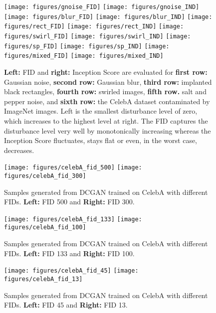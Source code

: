 \documentclass{article}
\begin{document}
\begin{figure}[H]
\texttt{[image: figures/gnoise\_FID]}
\texttt{[image: figures/gnoise\_IND]}
\texttt{[image: figures/blur\_FID]}
\texttt{[image: figures/blur\_IND]}
\texttt{[image: figures/rect\_FID]}
\texttt{[image: figures/rect\_IND]}
\texttt{[image: figures/swirl\_FID]}
\texttt{[image: figures/swirl\_IND]}
\texttt{[image: figures/sp\_FID]}
\texttt{[image: figures/sp\_IND]}
\texttt{[image: figures/mixed\_FID]}
\texttt{[image: figures/mixed\_IND]}
\caption[FID and Inception Score Comparison]{{\bf Left:} FID and {\bf right:}
Inception Score are evaluated for {\bf first row:} Gaussian noise, {\bf second row:} Gaussian blur, {\bf third row:}
implanted black rectangles, {\bf fourth row:} swirled images, {\bf fifth row.}
salt and pepper noise, and {\bf sixth row:} the CelebA dataset contaminated by
ImageNet images.
Left is the smallest disturbance level of zero, which increases to the highest
level at right. The FID captures the disturbance level very well by
monotonically increasing whereas the Inception Score fluctuates, stays flat or
even, in the worst case, decreases.
  \label{fig:fidind} }
\end{figure}

\begin{figure}[H]
\texttt{[image: figures/celebA\_fid\_500]}
\texttt{[image: figures/celebA\_fid\_300]}
\caption[CelebA Samples with FID 500 and 300]{Samples generated from DCGAN
trained on CelebA with different FIDs.
{\bf Left:} FID 500 and {\bf Right:} FID 300.
  \label{fig:fid1} }
\end{figure}

\begin{figure}[H]
\texttt{[image: figures/celebA\_fid\_133]}
\texttt{[image: figures/celebA\_fid\_100]}
\caption[CelebA Samples with FID 133 and 100]{Samples generated from DCGAN
trained on CelebA with different FIDs.
{\bf Left:} FID 133 and {\bf Right:} FID 100.
  \label{fig:fid2} }
\end{figure}

\begin{figure}[H]
\texttt{[image: figures/celebA\_fid\_45]}
\texttt{[image: figures/celebA\_fid\_13]}
\caption[CelebA Samples with FID 45 and 13]{Samples generated from DCGAN
trained on CelebA with different FIDs.
{\bf Left:} FID 45 and {\bf Right:} FID 13.
  \label{fig:fid3} }
\end{figure}
\end{document}
